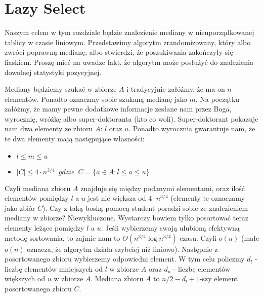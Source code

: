 \section{Lazy Select}

\label{sec:lazy}

Naszym celem w tym rozdziale będzie znalezienie mediany w nieuporządkowanej tablicy w czasie liniowym.
Przedstawimy algorytm zrandomizowany, który albo zwróci poprawną medianę, albo stwierdzi, że poszukiwania zakończyły się fiaskiem.
Proszę mieć na uwadze fakt, że algorytm może posłużyć do znalezienia dowolnej statystyki pozycyjnej.

Mediany będziemy szukać w zbiorze $A$ i tradycyjnie załóżmy, że ma on $n$ elementów.
Ponadto oznaczmy sobie szukaną medianę jako $m$.
Na początku załóżmy, że mamy pewne dodatkowe informacje zesłane nam przez Boga, wyrocznię, wróżkę albo super-doktoranta (kto co woli).
Super-doktorant pokazuje nam dwa elementy ze zbioru $A$: $l$ oraz $u$.
Ponadto wyrocznia gwarantuje nam, że te dwa elementy mają następujące własności:
\begin{itemize}
 \item $l \leq m \leq u$
 \item $|C| \leq 4 \cdot n^{3/4} \enspace gdzie \enspace C = \{a \in A: l \leq a \leq u\}$
\end{itemize}
Czyli mediana zbioru $A$ znajduje się między podanymi elementami, oraz ilość elementów pomiędzy $l$ a $u$ jest nie większa od $4 \cdot n^{3/4}$ (elementy te oznaczamy jako zbiór $C$).
Czy z taką boską pomocą student poradzi sobie ze znalezieniem mediany w zbiorze?
Niewykluczone.
Wystarczy bowiem tylko posortować teraz elementy leżące pomiędzy $l$ a $u$.
Jeśli wybierzemy swoją ulubioną efektywną metodę sortowania, to zajmie nam to $\Theta(n^{3/4} \log n^{3/4})$ czasu.
Czyli $o(n)$ (małe $o(n)$ oznacza, że algorytm działa szybciej niż liniowo).
Następnie z posortowanego zbioru wybierzemy odpowiedni element.
W tym celu policzmy $d_l$ - liczbę elementów mniejszych od $l$ w zbiorze $A$ oraz $d_u$ - liczbę elementów większych od $u$ w zbiorze $A$.
Mediana zbioru $A$ to $n/2 - d_l + 1$-szy element posortowanego zbioru $C$.

